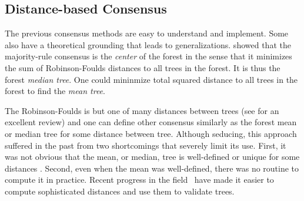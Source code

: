 \subsection{Distance-based Consensus} \label{sec:distance-based-consensus-tree}

The previous consensus methods are easy to understand and implement. Some also have a theoretical grounding that leads to generalizations. \citet{Barthelemy1986} showed that the majority-rule consensus is the \emph{center} of the forest in the sense that it minimizes the sum of Robinson-Foulds distances \citep{Robinson1979} to all trees in the forest. It is thus the forest \emph{median tree}. One could mininmize total squared distance to all trees in the forest to find the \emph{mean tree}. 

The Robinson-Foulds is but one of many distances between trees (see \citet{St.John2017} for an excellent review) and one can define other consensus similarly as the forest mean or median tree for some distance between tree. Although seducing, this approach suffered in the past from two shortcomings that severely limit its use. First, it was not obvious that the mean, or median, tree is well-defined or unique for some distances \citep{Billera2001}. Second, even when the mean was well-defined, there was no routine to compute it in practice. Recent progress in the field~\citep{Miller2015} have made it easier to compute sophisticated distances and use them to validate trees. %
